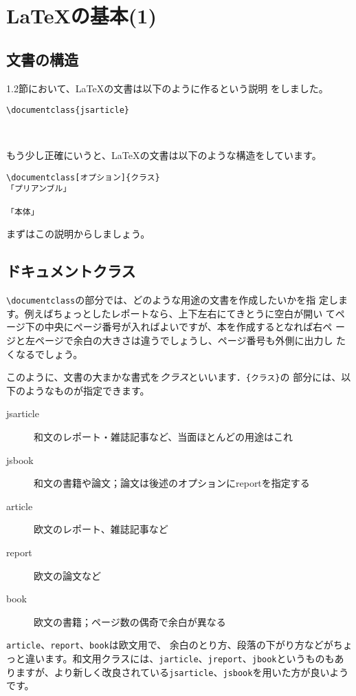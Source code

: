 
\section{\LaTeX の基本(1)}

\subsection{文書の構造}
1.2節において、{\LaTeX}の文書は以下のように作るという説明
をしました。
\begin{screen}
\begin{verbatim}
\documentclass{jsarticle}



\end{verbatim}
\end{screen}
もう少し正確にいうと、{\LaTeX}の文書は以下のような構造をしています。
\begin{screen}
\begin{verbatim}
\documentclass[オプション]{クラス}
「プリアンブル」

「本体」

\end{verbatim}
\end{screen}
まずはこの説明からしましょう。

\subsection{ドキュメントクラス}
\verb+\documentclass+の部分では、どのような用途の文書を作成したいかを指
定します。例えばちょっとしたレポートなら、上下左右にてきとうに空白が開い
てページ下の中央にページ番号が入ればよいですが、本を作成するとなれば右ペ
ージと左ページで余白の大きさは違うでしょうし、ページ番号も外側に出力し
たくなるでしょう。

このように、文書の大まかな書式を\emph{クラス}といいます．\verb+{クラス}+の
部分には、以下のようなものが指定できます。\\
\begin{description}
 \item[jsarticle] 和文のレポート・雑誌記事など、当面ほとんどの用途はこれ
 \item[jsbook] 和文の書籍や論文；論文は後述のオプションにreportを指定する
 \item[article] 欧文のレポート、雑誌記事など
 \item[report] 欧文の論文など
 \item[book] 欧文の書籍；ページ数の偶奇で余白が異なる
\end{description}
\verb|article|、\verb|report|、\verb|book|は欧文用で、
余白のとり方、段落の下がり方などがちょっと違います。和文用クラスには、\verb|jarticle|、\verb|jreport|、\verb|jbook|というものもありますが、より新しく改良されている\verb|jsarticle|、\verb|jsbook|を用いた方が良いようです。

